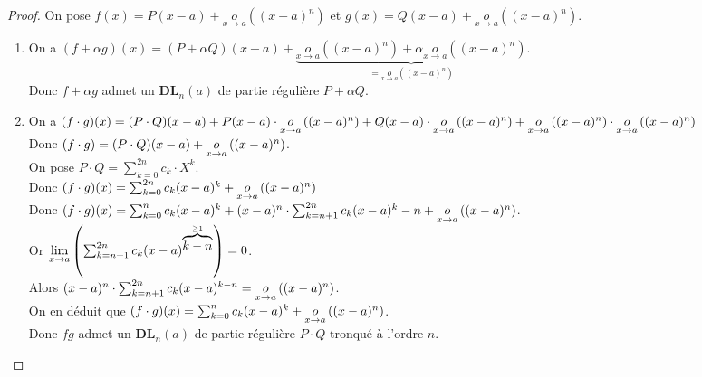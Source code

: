 \documentclass[12pt, a4paper]{report}
\begin{document}
\begin{proof}
    On pose $f(x)= P(x-a) + \underset{x\to a}{o}((x-a)^n)$ et $g(x) = Q(x-a) + \underset{x\to a}{o}((x-a)^n)$.

    \begin{enumerate}
        \item On a $(f+\alpha g)(x) = (P+\alpha Q)(x-a) + \underbrace{\underset{x\to a}{o}((x-a)^n) + \alpha\underset{x\to a}{o}((x-a)^n)}_{=\underset{x\to a}{o}((x-a)^n)}$.\\Donc $f + \alpha g$ admet un $\mathbf{DL}_n(a)$ de partie régulière $P + \alpha Q$.
        \item On a $(f\cdot g)(x)=(P\cdot Q)(x-a)+P(x-a)\cdot \underset{x\to a}{o}\left((x-a)^n\right)+Q(x-a)\cdot \underset{x\to a}{o}\left((x-a)^n\right) + \underset{x\to a}{o}\left((x-a)^n\right)\cdot \underset{x\to a}{o}\left((x-a)^n\right)$\\
        Donc $(f\cdot g)=(P\cdot Q)(x-a)+\underset{x\to a}{o}\left((x-a)^n\right)$.\\
        On pose $P\cdot Q = \sum_{k=0}^{2n}c_k \cdot X^k$.\\
        Donc $(f\cdot g)(x)=\sum_{k=0}^{2n}c_k(x-a)^k + \underset{x\to a}{o}\left((x-a)^n\right)$\\
        Donc $(f\cdot g)(x)=\sum_{k=0}^{n}c_k(x-a)^k + (x-a)^n\cdot\sum_{k=n+1}^{2n}c_k(x-a)^k-n+\underset{x\to a}{o}\left((x-a)^n\right)$.\\
        Or $\lim\limits_{x\to a} \left(\sum_{k=n+1}^{2n}c_k(x-a)^{\overbrace{k-n}^{\ge 1}}\right) = 0$.\\
        Alors $(x-a)^n \cdot \sum_{k=n+1}^{2n}c_k(x-a)^{k-n} = \underset{x\to a}{o}\left((x-a)^n\right)$.\\
        On en déduit que $(f\cdot g)(x) = \sum_{k=0}^{n}c_k(x-a)^k + \underset{x\to a}{o}\left((x-a)^n\right)$.\\
        Donc $fg$ admet un $\mathbf{DL}_n(a)$ de partie régulière $P\cdot Q$ tronqué à l'ordre $n$.
    \end{enumerate}
\end{proof}
\end{document}
